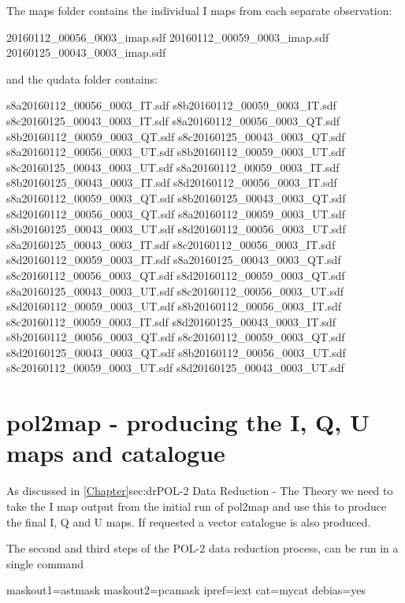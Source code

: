 The maps folder contains the individual I maps from each separate observation:

\begin{terminalv}
20160112_00056_0003_imap.sdf  20160112_00059_0003_imap.sdf  20160125_00043_0003_imap.sdf
\end{terminalv}

and the qudata folder contains:

\begin{terminalv}
s8a20160112_00056_0003_IT.sdf  s8b20160112_00059_0003_IT.sdf  s8c20160125_00043_0003_IT.sdf
s8a20160112_00056_0003_QT.sdf  s8b20160112_00059_0003_QT.sdf  s8c20160125_00043_0003_QT.sdf
s8a20160112_00056_0003_UT.sdf  s8b20160112_00059_0003_UT.sdf  s8c20160125_00043_0003_UT.sdf
s8a20160112_00059_0003_IT.sdf  s8b20160125_00043_0003_IT.sdf  s8d20160112_00056_0003_IT.sdf
s8a20160112_00059_0003_QT.sdf  s8b20160125_00043_0003_QT.sdf  s8d20160112_00056_0003_QT.sdf
s8a20160112_00059_0003_UT.sdf  s8b20160125_00043_0003_UT.sdf  s8d20160112_00056_0003_UT.sdf
s8a20160125_00043_0003_IT.sdf  s8c20160112_00056_0003_IT.sdf  s8d20160112_00059_0003_IT.sdf
s8a20160125_00043_0003_QT.sdf  s8c20160112_00056_0003_QT.sdf  s8d20160112_00059_0003_QT.sdf
s8a20160125_00043_0003_UT.sdf  s8c20160112_00056_0003_UT.sdf  s8d20160112_00059_0003_UT.sdf
s8b20160112_00056_0003_IT.sdf  s8c20160112_00059_0003_IT.sdf  s8d20160125_00043_0003_IT.sdf
s8b20160112_00056_0003_QT.sdf  s8c20160112_00059_0003_QT.sdf  s8d20160125_00043_0003_QT.sdf
s8b20160112_00056_0003_UT.sdf  s8c20160112_00059_0003_UT.sdf  s8d20160125_00043_0003_UT.sdf
\end{terminalv}


\section{pol2map - producing the I, Q, U maps and catalogue}


As discussed in \cref{Chapter}{sec:dr}{POL-2 Data Reduction - The Theory} we need to take the I map output from the initial run of pol2map
and use this to produce the final I, Q and U maps. If requested a vector catalogue is also produced.

The second and third steps of the POL-2 data reduction process,  can be run in a single command

\begin{terminalv}
          maskout1=astmask maskout2=pcamask ipref=iext cat=mycat debias=yes
\end{terminalv}

